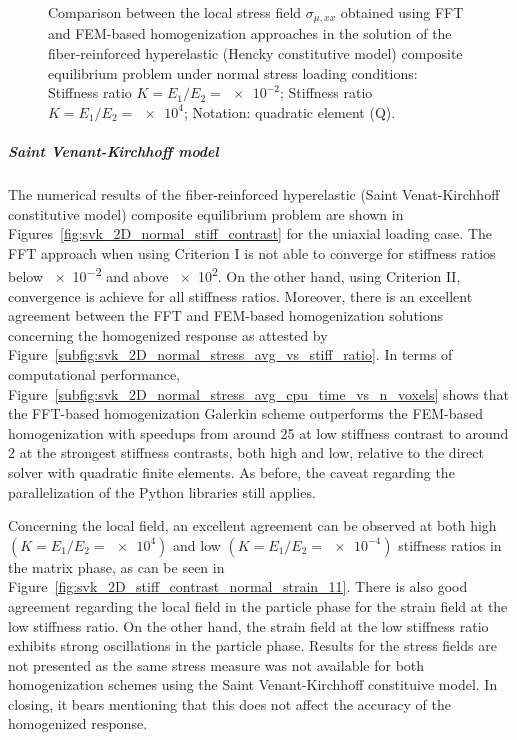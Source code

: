 \begin{figure}[hbt]
\begin{subfigure}[b]{\textwidth}
    \caption{}
    \label{subfig:hencky_2D_ratio_-4_normal_stress_11}
  \end{subfigure}
  \caption{Comparison between the local stress field \(\sigma_{\mu,xx}\) obtained using
  FFT and FEM-based homogenization approaches in the solution of the fiber-reinforced
  hyperelastic (Hencky constitutive model) composite equilibrium problem under normal stress loading conditions:
   Stiffness ratio \(K=E_1/E_2=\num{e-2}\);
   Stiffness ratio \(K=E_1/E_2=\num{e4}\);
  Notation: quadratic element (Q).}
\label{fig:hencky_2D_stiff_contrast_normal_strain_11}
\end{figure}

\FloatBarrier

\subparagraph{Saint Venant-Kirchhoff model}

The numerical results of the fiber-reinforced hyperelastic (Saint Venat-Kirchhoff constitutive model) composite equilibrium problem are shown in Figures~\ref{fig:svk_2D_normal_stiff_contrast} for the uniaxial loading case.
The FFT approach when using Criterion I is not able to converge for stiffness ratios below \num{e-2} and above \num{e2}.
On the other hand, using Criterion II, convergence is achieve for all stiffness ratios.
Moreover, there is an excellent agreement between the FFT and FEM-based homogenization solutions concerning the homogenized response as attested by Figure~\ref{subfig:svk_2D_normal_stress_avg_vs_stiff_ratio}.
In terms of computational performance, Figure~\ref{subfig:svk_2D_normal_stress_avg_cpu_time_vs_n_voxels} shows that the FFT-based homogenization Galerkin scheme outperforms the FEM-based homogenization with speedups from around 25 at low stiffness contrast to around 2 at the strongest stiffness contrasts, both high and low, relative to the direct solver with quadratic finite elements.
As before, the caveat regarding the parallelization of the Python libraries still applies.

Concerning the local field, an excellent agreement can be observed at both high \((K=E_1/E_2=\num{e4})\) and low \((K=E_1/E_2=\num{e-4})\) stiffness ratios in the matrix phase, as can be seen in Figure~\ref{fig:svk_2D_stiff_contrast_normal_strain_11}.
There is also good agreement regarding the local field in the particle phase for the strain field at the low stiffness ratio.
On the other hand, the strain field at the low stiffness ratio exhibits strong oscillations in the particle phase.
Results for the stress fields are not presented as the same stress measure was not available for both homogenization schemes using the Saint Venant-Kirchhoff constituive model.
In closing, it bears mentioning that this does not affect the accuracy of the homogenized response.

